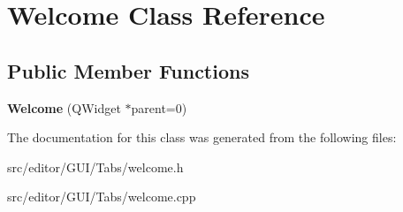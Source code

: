 \hypertarget{class_welcome}{\section{\-Welcome \-Class \-Reference}
\label{class_welcome}
}
\subsection*{\-Public \-Member \-Functions}
\begin{DoxyCompactItemize}
\item 
\hypertarget{class_welcome_acf62624f1107ddc68761d25febbf10ad}{{\bfseries \-Welcome} (\-Q\-Widget $\ast$parent=0)}\label{class_welcome_acf62624f1107ddc68761d25febbf10ad}

\end{DoxyCompactItemize}


\-The documentation for this class was generated from the following files\-:\begin{DoxyCompactItemize}
\item 
src/editor/\-G\-U\-I/\-Tabs/welcome.\-h\item 
src/editor/\-G\-U\-I/\-Tabs/welcome.\-cpp\end{DoxyCompactItemize}
